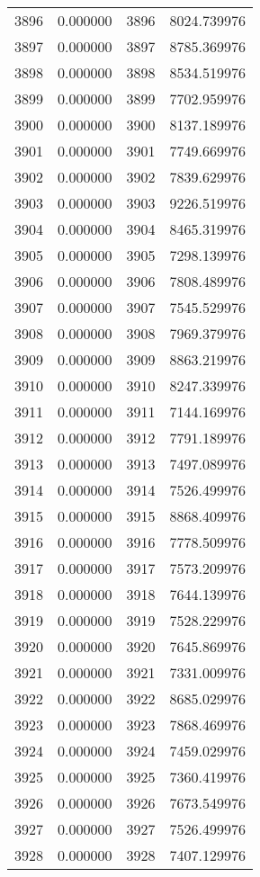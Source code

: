 \documentclass[12pt]{article}
\begin{document}
\begin{longtable}{@{}cccc@{}}
3896 & 0.000000 & 3896 & 8024.739976 \\
3897 & 0.000000 & 3897 & 8785.369976 \\
3898 & 0.000000 & 3898 & 8534.519976 \\
3899 & 0.000000 & 3899 & 7702.959976 \\
3900 & 0.000000 & 3900 & 8137.189976 \\
3901 & 0.000000 & 3901 & 7749.669976 \\
3902 & 0.000000 & 3902 & 7839.629976 \\
3903 & 0.000000 & 3903 & 9226.519976 \\
3904 & 0.000000 & 3904 & 8465.319976 \\
3905 & 0.000000 & 3905 & 7298.139976 \\
3906 & 0.000000 & 3906 & 7808.489976 \\
3907 & 0.000000 & 3907 & 7545.529976 \\
3908 & 0.000000 & 3908 & 7969.379976 \\
3909 & 0.000000 & 3909 & 8863.219976 \\
3910 & 0.000000 & 3910 & 8247.339976 \\
3911 & 0.000000 & 3911 & 7144.169976 \\
3912 & 0.000000 & 3912 & 7791.189976 \\
3913 & 0.000000 & 3913 & 7497.089976 \\
3914 & 0.000000 & 3914 & 7526.499976 \\
3915 & 0.000000 & 3915 & 8868.409976 \\
3916 & 0.000000 & 3916 & 7778.509976 \\
3917 & 0.000000 & 3917 & 7573.209976 \\
3918 & 0.000000 & 3918 & 7644.139976 \\
3919 & 0.000000 & 3919 & 7528.229976 \\
3920 & 0.000000 & 3920 & 7645.869976 \\
3921 & 0.000000 & 3921 & 7331.009976 \\
3922 & 0.000000 & 3922 & 8685.029976 \\
3923 & 0.000000 & 3923 & 7868.469976 \\
3924 & 0.000000 & 3924 & 7459.029976 \\
3925 & 0.000000 & 3925 & 7360.419976 \\
3926 & 0.000000 & 3926 & 7673.549976 \\
3927 & 0.000000 & 3927 & 7526.499976 \\
3928 & 0.000000 & 3928 & 7407.129976 \\

\end{longtable}
\end{document}
